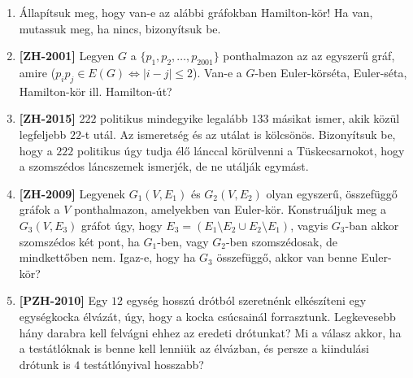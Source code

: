 \documentclass[a4paper,12pt]{article}
\begin{document}
        \noindent{}
        \noindent{}
        \begin{enumerate}

            \item Állapítsuk meg, hogy van-e az alábbi gráfokban Hamilton-kör! Ha van, mutassuk meg, ha nincs, bizonyítsuk be.
            \begin{figure}[!h]
                \centering
                \begin{subfigure}{0.3\textwidth}
                    \centering
                    
                \end{subfigure}
                \begin{subfigure}{0.3\textwidth}
                    \centering
                    
                \end{subfigure}
            \end{figure}

            \item \textbf{[ZH-2001]} Legyen $G$ a $\{p_1, p_2, \ldots, p_{2001}\}$ ponthalmazon az az egyszerű gráf, amire ($p_i p_j \in E(G) \Leftrightarrow |i-j| \le 2$). Van-e a $G$-ben Euler-körséta, Euler-séta, Hamilton-kör ill. Hamilton-út?
            
            \item \textbf{[ZH-2015]} $222$ politikus mindegyike legalább $133$ másikat ismer, akik közül legfeljebb $22$-t utál. Az ismeretség és az utálat is kölcsönös. Bizonyítsuk be, hogy a $222$ politikus úgy tudja élő lánccal körülvenni a Tüskecsarnokot, hogy a szomszédos láncszemek ismerjék, de ne utálják egymást.

            \item \textbf{[ZH-2009]} Legyenek $G_1(V,E_1)$ és $G_2(V,E_2)$ olyan egyszerű, összefüggő gráfok a $V$ ponthalmazon, amelyekben van Euler-kör. Konstruáljuk meg a $G_3(V,E_3)$ gráfot úgy, hogy $E_3=(E_1\setminus E_2 \cup E_2 \setminus E_1)$, vagyis $G_3$-ban akkor szomszédos két pont, ha $G_1$-ben, vagy $G_2$-ben szomszédosak, de mindkettőben nem. Igaz-e, hogy ha $G_3$ összefüggő, akkor van benne Euler-kör?


            \item \textbf{[PZH-2010]} Egy $12$ egység hosszú drótból szeretnénk elkészíteni egy egységkocka élvázát, úgy, hogy a kocka csúcsainál forrasztunk. Legkevesebb hány darabra kell felvágni ehhez az eredeti drótunkat? Mi a válasz akkor, ha a testátlóknak is benne kell lenniük az élvázban, és persze a kiindulási drótunk is $4$ testátlónyival hosszabb?


\end{enumerate}
\end{document}
